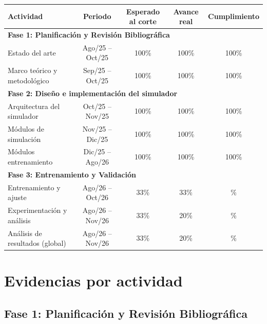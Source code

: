 \documentclass[letterpaper,10pt,oneside]{article}
\def\espEntrenamiento{33}   \def\realEntrenamiento{33}
\def\espExperimentos{33}    \def\realExperimentos{20}
\def\espAnalisis{33}        \def\realAnalisis{20}
\newcommand\cumplimiento[2]{\fpeval{min(100, round(100*(#2)/(#1), 0))}\%}
\begin{document}
	\begin{table}[H]
		\centering
		\renewcommand{\arraystretch}{1.2}
		\begin{tabular}{l c c c c}
			\toprule
			\textbf{Actividad} & \textbf{Periodo} & \textbf{Esperado al corte} & \textbf{Avance real} & \textbf{Cumplimiento} \\
			\midrule
			\multicolumn{5}{l}{\textbf{Fase 1: Planificación y Revisión Bibliográfica}} \\
			Estado del arte                  & Ago/25 -- Oct/25 & 100\% & 100\% & 100\% \\
			Marco teórico y metodológico     & Sep/25 -- Oct/25 & 100\% & 100\% & 100\% \\
			\multicolumn{5}{l}{\textbf{Fase 2: Diseño e implementación del simulador}} \\
			Arquitectura del simulador       & Oct/25 -- Nov/25 & 100\% & 100\% & 100\% \\
			Módulos de simulación            & Nov/25 -- Dic/25 & 100\% & 100\% & 100\% \\
			Módulos entrenamiento            & Dic/25 -- Ago/26 & 100\% & 100\% & 100\% \\
			\multicolumn{5}{l}{\textbf{Fase 3: Entrenamiento y Validación}} \\
			Entrenamiento y ajuste           & Ago/26 -- Oct/26 & \espEntrenamiento\% & \realEntrenamiento\% & \cumplimiento{\espEntrenamiento}{\realEntrenamiento} \\
			Experimentación y análisis       & Ago/26 -- Nov/26 & \espExperimentos\%  & \realExperimentos\%  & \cumplimiento{\espExperimentos}{\realExperimentos} \\
			Análisis de resultados (global)  & Ago/26 -- Nov/26 & \espAnalisis\%      & \realAnalisis\%      & \cumplimiento{\espAnalisis}{\realAnalisis} \\
			\bottomrule
		\end{tabular}
	\end{table}

	\section{Evidencias por actividad}

	\subsection*{Fase 1: Planificación y Revisión Bibliográfica}
\end{document}
